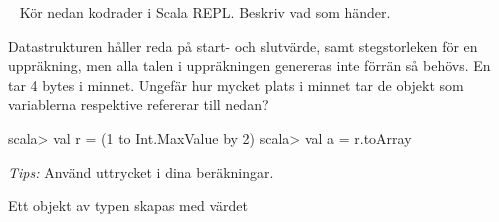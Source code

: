 \QUESTEND









\QUESTBEGIN

\Task \label{task:array} \what~   Kör nedan kodrader i Scala REPL. Beskriv vad som händer.

\Subtask {}

\Subtask {}

\Subtask {}

\Subtask {}

\Subtask {}

\Subtask {}

\Subtask {}

\Subtask {}

\Subtask {}

\Subtask {}

\Subtask {}

\Subtask {}

\Subtask {}

\Subtask {}

\Subtask {}

\Subtask {}

\Subtask {}

\Subtask\Pen Datastrukturen  håller reda på start- och slutvärde, samt stegstorleken för en uppräkning, men alla talen i uppräkningen genereras inte förrän så behövs. En  tar 4 bytes i minnet. Ungefär hur mycket plats i minnet tar de objekt som variablerna  respektive  refererar till nedan?
\begin{REPL}
scala> val r = (1 to Int.MaxValue by 2)
scala> val a = r.toArray
\end{REPL}
\emph{Tips:} Använd uttrycket  i dina beräkningar.

\SOLUTION


\TaskSolved \what
 

\SubtaskSolved  Ett objekt av typen  skapas med värdet 

